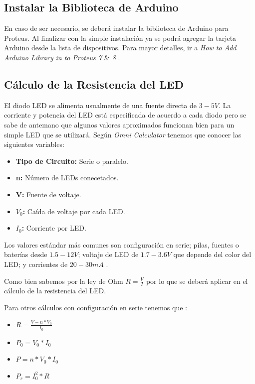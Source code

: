 \documentclass{article}
\begin{document}
    \subsection{Instalar la Biblioteca de Arduino}

    En caso de ser necesario, se deberá instalar la biblioteca de Arduino
    para Proteus. Al finalizar con la simple instalación ya se podrá agregar
    la tarjeta Arduino desde la lista de dispositivos. Para mayor detalles,
    ir a \textit{How to Add Arduino Library in to Proteus 7 $\&$ 8}
    \cite{instructables-2018}.

    \subsection{Cálculo de la Resistencia del LED}

    El diodo LED se alimenta usualmente de una fuente directa de $3-5V$. La
    corriente y potencia del LED está especificada de acuerdo a cada diodo
    pero se sabe de antemano que algunos valores aproximados funcionan bien
    para un simple LED que se utilizará. Según \textit{Omni Calculator}
    \cite{szyk-2022} tenemos que conocer las siguientes variables:

    \begin{itemize}
        \item \textbf{Tipo de Circuito:} Serie o paralelo.
        \item \textbf{n:} Número de LEDs conecetados.
        \item \textbf{V:} Fuente de voltaje.
        \item \textbf{$V_0$:} Caída de voltaje por cada LED.
        \item \textbf{$I_0$:} Corriente por LED.
    \end{itemize}

    Los valores estándar más comunes son configuración en serie; pilas,
    fuentes o baterías desde $1.5-12V$; voltaje de LED de $1.7-3.6V$ que
    depende del color del LED; y corrientes de $20-30mA$ \cite{szyk-2022}.

    \bigbreak

    Como bien sabemos por la ley de Ohm $R = \frac{V}{I}$ por lo que se
    deberá aplicar en el cálculo de la resistencia del LED.

    \bigbreak

    Para otros cálculos con configuración en serie tenemos que \cite{szyk-2022}:

    \begin{itemize}
        \item $R = \frac{V - n*V_0}{I_0}$
        \item $P_0 = V_0 * I_0$
        \item $P = n * V_0 * I_0$
        \item $P_r = I_0^2 * R$
    \end{itemize}
\end{document}
